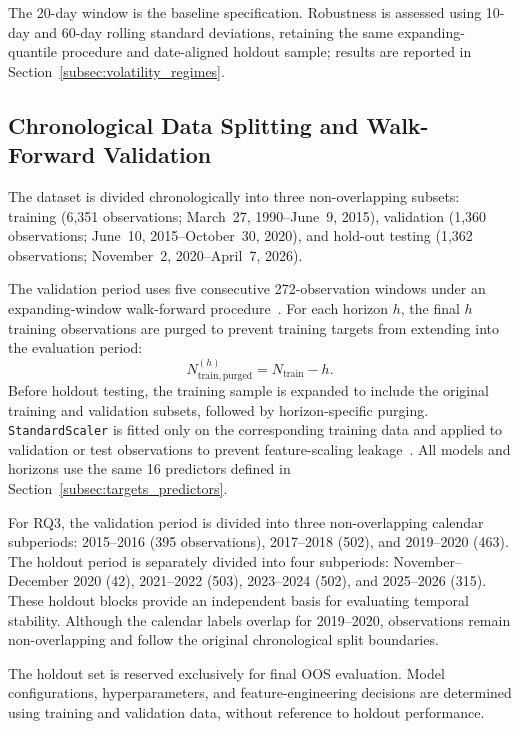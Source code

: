 \documentclass[runningheads,orivec]{llncs}
\begin{document}
The 20-day window is the baseline specification. Robustness is assessed using 10-day and 60-day rolling standard deviations, retaining the same expanding-quantile procedure and date-aligned holdout sample; results are reported in Section~\ref{subsec:volatility_regimes}.

\subsection{Chronological Data Splitting and Walk-Forward Validation}\label{subsec:data_splitting}

The dataset is divided chronologically into three non-overlapping subsets: training (6,351 observations; March~27, 1990--June~9, 2015), validation (1,360 observations; June~10, 2015--October~30, 2020), and hold-out testing (1,362 observations; November~2, 2020--April~7, 2026).

The validation period uses five consecutive 272-observation windows under an expanding-window walk-forward procedure~\cite{tashman2000}. For each horizon $h$, the final $h$ training observations are purged to prevent training targets from extending into the evaluation period:
\begin{equation}\label{eq:train_purged}
N_{\mathrm{train,purged}}^{(h)} = N_{\mathrm{train}} - h.
\end{equation}
Before holdout testing, the training sample is expanded to include the original training and validation subsets, followed by horizon-specific purging. \texttt{StandardScaler} is fitted only on the corresponding training data and applied to validation or test observations to prevent feature-scaling leakage~\cite{hewamalage2023}. All models and horizons use the same 16 predictors defined in Section~\ref{subsec:targets_predictors}.

For RQ3, the validation period is divided into three non-overlapping calendar subperiods: 2015--2016 (395 observations), 2017--2018 (502), and 2019--2020 (463). The holdout period is separately divided into four subperiods: November--December 2020 (42), 2021--2022 (503), 2023--2024 (502), and 2025--2026 (315). These holdout blocks provide an independent basis for evaluating temporal stability. Although the calendar labels overlap for 2019--2020, observations remain non-overlapping and follow the original chronological split boundaries.

The holdout set is reserved exclusively for final OOS evaluation. Model configurations, hyperparameters, and feature-engineering decisions are determined using training and validation data, without reference to holdout performance.
\end{document}
